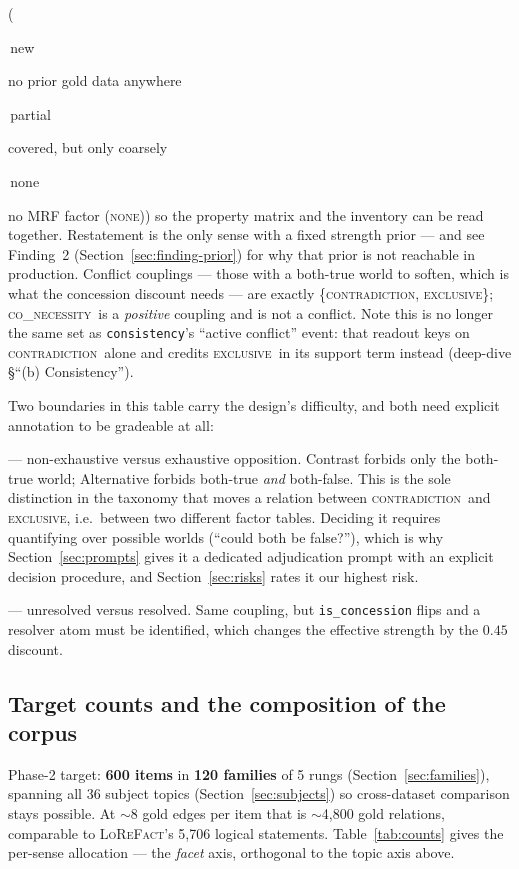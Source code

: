 \documentclass[11pt]{article}
\newcommand{\keyNew}{\colorbox{cNew}{\strut\,new\,}}
\newcommand{\keyPartial}{\colorbox{cPartial}{\strut\,partial\,}}
\newcommand{\keyNoFactor}{\colorbox{cGap}{\strut\,none\,}}
\newcommand{\coverageLegend}{%
  \keyNew{} no prior gold data anywhere \quad
  \keyPartial{} covered, but only coarsely \quad
  \keyNoFactor{} no MRF factor (\cNone)}
\newcommand{\cCon}{\textsc{contradiction}}
\newcommand{\cExc}{\textsc{exclusive}}
\newcommand{\cCoN}{\textsc{co\_necessity}}
\newcommand{\cNone}{\textsc{none}}
\newcommand{\readout}[1]{\texttt{#1}}
\begin{document}
\begin{table}[h]
{(\coverageLegend) so the property matrix and the inventory can be read together. Restatement is
the only sense with a fixed strength prior --- and see Finding~2
(Section~\ref{sec:finding-prior}) for why that prior is not reachable in production. Conflict
couplings --- those with a both-true world to soften, which is what the concession discount
needs --- are exactly \{\cCon, \cExc\}; \cCoN\ is a \emph{positive} coupling and is not a
conflict. Note this is no longer the same set as \readout{consistency}'s ``active conflict''
event: that readout keys on \cCon\ alone and credits \cExc\ in its support term instead
(deep-dive \S``(b) Consistency'').}
\label{tab:compile}
\end{table}

Two boundaries in this table carry the design's difficulty, and both need explicit annotation
to be gradeable at all:

\begin{description}[leftmargin=*,nosep]
  \item[Contrast vs.\ Alternative] --- non-exhaustive versus exhaustive opposition. Contrast
        forbids only the both-true world; Alternative forbids both-true \emph{and}
        both-false. This is the sole distinction in the taxonomy that moves a relation between
        \cCon\ and \cExc, i.e.\ between two different factor tables. Deciding it requires
        quantifying over possible worlds (``could both be false?''), which is why
        Section~\ref{sec:prompts} gives it a dedicated adjudication prompt with an explicit
        decision procedure, and Section~\ref{sec:risks} rates it our highest risk.
  \item[Contrast vs.\ Concession] --- unresolved versus resolved. Same coupling, but
        \texttt{is\_concession} flips and a resolver atom must be identified, which changes
        the effective strength by the $0.45$ discount.
\end{description}

\clearpage

\subsection{Target counts and the composition of the corpus}
\label{sec:counts}

Phase-2 target: \textbf{600 items} in \textbf{120 families} of 5 rungs
(Section~\ref{sec:families}), spanning all 36 subject topics
(Section~\ref{sec:subjects}) so cross-dataset comparison stays possible. At $\sim$8 gold edges
per item that is $\sim$4{,}800 gold relations, comparable to \textsc{LoReFact}'s 5{,}706 logical
statements. Table~\ref{tab:counts} gives the per-sense allocation --- the \emph{facet} axis,
orthogonal to the topic axis above.
\end{document}

